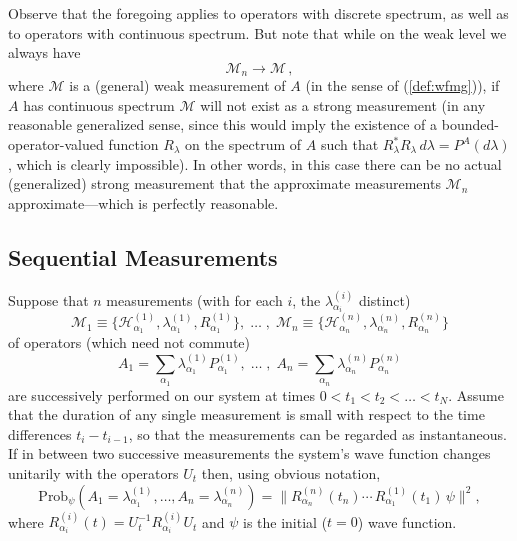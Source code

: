 \documentclass[12pt]{article}
\newcommand{\wf}{wave function}
\renewcommand{\a}{\alpha}
\renewcommand{\H}{\mbox{$\mathcal{H}$}}
\newcommand{\M}{\mbox{$\mathcal{M}$}}
\newcommand{\prob}{\mbox{Prob}_{\psi}}
\begin{document}
Observe that the foregoing applies to operators with discrete
spectrum, as well as to operators with continuous spectrum.  But note
that while on the weak level we always have
%
\begin{displaymath}
\M_n \to \M \,,
\end{displaymath}
%
where $\M$ is a (general) weak measurement of $A$ (in the sense of
(\ref{def:wfmg})), if $A$ has continuous spectrum $\M$ will not exist
as a strong measurement (in any reasonable generalized sense, since
this would imply the existence of a bounded-operator-valued function
$R_\lambda$ on the spectrum of $A$ such that
$R^{\ast}_{\lambda}R_\lambda\, d\lambda = P^A (d\lambda)$, which is
clearly impossible).  In other words, in this case there can be no
actual (generalized) strong measurement that the approximate
measurements $\M_{n}$ approximate---which is perfectly reasonable.



\subsection{Sequential Measurements}
\label{sec:SeqM}

Suppose that $n$ measurements (with for each $i$, the
$\lambda^{(i)}_{\alpha_{i}}$ distinct)
%
\begin{displaymath}
\M_{1}\equiv \{ \H^{(1)}_{\alpha_{1}} , \lambda^{(1)}_{\alpha_{1}} ,
R^{(1)}_{\alpha_{1}}  \},\;
\dots\;,\; \M_{n}\equiv \{
\H^{(n)}_{\alpha_{n}},\lambda^{(n)}_{\alpha_{n}},
R^{(n)}_{\alpha_{n}}  \}
\end{displaymath}
%
of operators (which need not commute)
%
\begin{displaymath}
A_{1}= \sum_{\alpha_{1}}\lambda^{(1)}_{\alpha_{1}}
P^{(1)}_{\alpha_{1}},\;
\dots\;,\; A_{n}= \sum_{\alpha_{n}}\lambda^{(n)}_{\alpha_{n}}
P^{(n)}_{\alpha_{n}}
\end{displaymath}
%
are successively performed on our system at times $0 < t_1 < t_2<\dots
<t_N$.  Assume that the duration of any single measurement is small
with respect to the time differences $t_{i}-t_{i-1}$, so that the
measurements can be regarded as instantaneous.  If in between two
successive measurements the system's \wf{} changes unitarily with the
operators $U_{t}$ then, using obvious notation,
%
\begin{equation}
\prob (A_{1}=\lambda^{(1)}_{\alpha_{1}},\ldots , A_{n} =
\lambda^{(n)}_{\alpha_{n}} ) = \|
R^{(n)}_{\alpha_{n}}(t_{n})
\cdots\,R^{(1)}_{\alpha_{1}}(t_{1}) \, \psi\|^2 ,
\label{eq:conprop}
\end{equation}
%
where $R_{\a_{i}}^{(i)}(t) = U_{t}^{-1} R_{\a_{i}}^{(i)}U_{t}$ and
$\psi$ is the initial ($t=0$) \wf{}.
\end{document}
